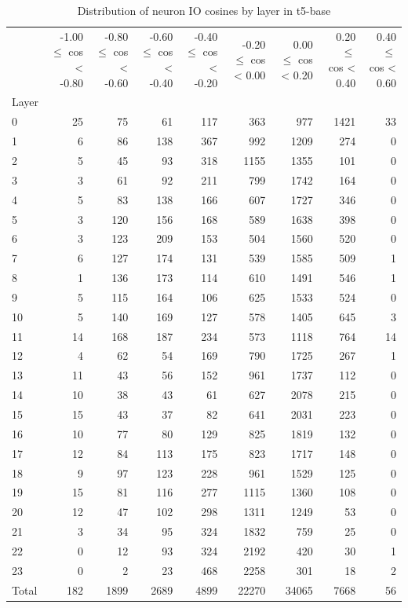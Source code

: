 \begin{table}
\caption{Distribution of neuron IO cosines by layer in t5-base}
\label{tab:t5-base_half_coarse}
\begin{tabular}{lrrrrrrrr}
 & -1.00 $\leq$ cos < -0.80 & -0.80 $\leq$ cos < -0.60 & -0.60 $\leq$ cos < -0.40 & -0.40 $\leq$ cos < -0.20 & -0.20 $\leq$ cos < 0.00 & 0.00 $\leq$ cos < 0.20 & 0.20 $\leq$ cos < 0.40 & 0.40 $\leq$ cos < 0.60 \\
Layer &  &  &  &  &  &  &  &  \\
0 & 25 & 75 & 61 & 117 & 363 & 977 & 1421 & 33 \\
1 & 6 & 86 & 138 & 367 & 992 & 1209 & 274 & 0 \\
2 & 5 & 45 & 93 & 318 & 1155 & 1355 & 101 & 0 \\
3 & 3 & 61 & 92 & 211 & 799 & 1742 & 164 & 0 \\
4 & 5 & 83 & 138 & 166 & 607 & 1727 & 346 & 0 \\
5 & 3 & 120 & 156 & 168 & 589 & 1638 & 398 & 0 \\
6 & 3 & 123 & 209 & 153 & 504 & 1560 & 520 & 0 \\
7 & 6 & 127 & 174 & 131 & 539 & 1585 & 509 & 1 \\
8 & 1 & 136 & 173 & 114 & 610 & 1491 & 546 & 1 \\
9 & 5 & 115 & 164 & 106 & 625 & 1533 & 524 & 0 \\
10 & 5 & 140 & 169 & 127 & 578 & 1405 & 645 & 3 \\
11 & 14 & 168 & 187 & 234 & 573 & 1118 & 764 & 14 \\
12 & 4 & 62 & 54 & 169 & 790 & 1725 & 267 & 1 \\
13 & 11 & 43 & 56 & 152 & 961 & 1737 & 112 & 0 \\
14 & 10 & 38 & 43 & 61 & 627 & 2078 & 215 & 0 \\
15 & 15 & 43 & 37 & 82 & 641 & 2031 & 223 & 0 \\
16 & 10 & 77 & 80 & 129 & 825 & 1819 & 132 & 0 \\
17 & 12 & 84 & 113 & 175 & 823 & 1717 & 148 & 0 \\
18 & 9 & 97 & 123 & 228 & 961 & 1529 & 125 & 0 \\
19 & 15 & 81 & 116 & 277 & 1115 & 1360 & 108 & 0 \\
20 & 12 & 47 & 102 & 298 & 1311 & 1249 & 53 & 0 \\
21 & 3 & 34 & 95 & 324 & 1832 & 759 & 25 & 0 \\
22 & 0 & 12 & 93 & 324 & 2192 & 420 & 30 & 1 \\
23 & 0 & 2 & 23 & 468 & 2258 & 301 & 18 & 2 \\
Total & 182 & 1899 & 2689 & 4899 & 22270 & 34065 & 7668 & 56 \\
\end{tabular}
\end{table}
